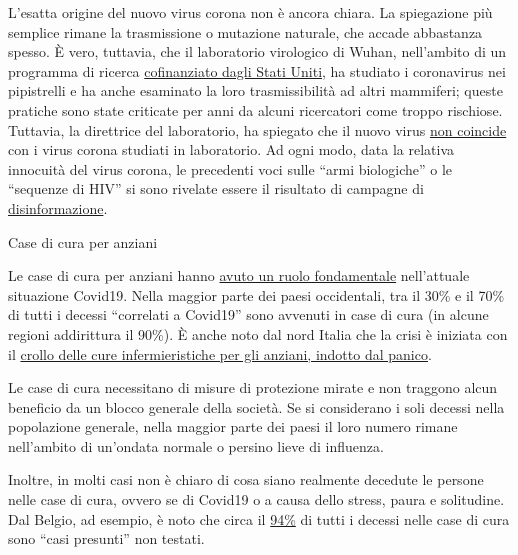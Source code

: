 L'esatta origine del nuovo virus corona non è ancora chiara. La
spiegazione più semplice rimane la trasmissione o mutazione naturale,
che accade abbastanza spesso. È vero, tuttavia, che il laboratorio
virologico di Wuhan, nell'ambito di un programma di ricerca
\href{https://www.newsweek.com/dr-fauci-backed-controversial-wuhan-lab-millions-us-dollars-risky-coronavirus-research-1500741}{cofinanziato
dagli Stati Uniti}, ha studiato i coronavirus nei pipistrelli e ha anche
esaminato la loro trasmissibilità ad altri mammiferi; queste pratiche
sono state criticate per anni da alcuni ricercatori come troppo
rischiose. Tuttavia, la direttrice del laboratorio, ha spiegato che il
nuovo virus
\href{https://www.scientificamerican.com/article/how-chinas-bat-woman-hunted-down-viruses-from-sars-to-the-new-coronavirus1/}{non
coincide} con i virus corona studiati in laboratorio. Ad ogni modo, data
la relativa innocuità del virus corona, le precedenti voci sulle ``armi
biologiche'' o le ``sequenze di HIV'' si sono rivelate essere il
risultato di campagne di
\href{https://onlinelibrary.wiley.com/doi/full/10.1111/eci.13222}{disinformazione}.

Case di cura per anziani

Le case di cura per anziani hanno
\href{https://ltccovid.org/2020/04/12/mortality-associated-with-covid-19-outbreaks-in-care-homes-early-international-evidence/}{avuto
un ruolo fondamentale} nell'attuale situazione Covid19. Nella maggior
parte dei paesi occidentali, tra il 30\% e il 70\% di tutti i decessi
``correlati a Covid19'' sono avvenuti in case di cura (in alcune regioni
addirittura il 90\%). È anche noto dal nord Italia che la crisi è
iniziata con il
\href{https://swprs.org/covid-19-a-report-from-italy/}{crollo delle cure
infermieristiche per gli anziani, indotto dal panico}.

Le case di cura necessitano di misure di protezione mirate e non
traggono alcun beneficio da un blocco generale della società. Se si
considerano i soli decessi nella popolazione generale, nella maggior
parte dei paesi il loro numero rimane nell'ambito di un'ondata normale o
persino lieve di influenza.

Inoltre, in molti casi non è chiaro di cosa siano realmente decedute le
persone nelle case di cura, ovvero se di Covid19 o a causa dello stress,
paura e solitudine. Dal Belgio, ad esempio, è noto che circa il
\href{https://covid-19.sciensano.be/sites/default/files/Covid19/Meest\%20recente\%20update.pdf}{94\%}
di tutti i decessi nelle case di cura sono ``casi presunti'' non
testati.

